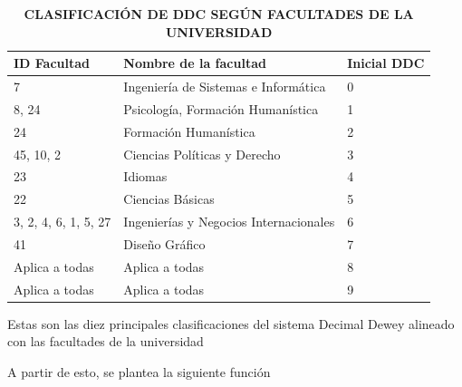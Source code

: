 \documentclass[spanish]{ieee_upb}
\begin{document}
\begin{table}[H]
    
    \centering
    \caption[Clasificación DDC según facultades de la universidad]{\bfseries CLASIFICACIÓN DE DDC SEGÚN FACULTADES DE LA UNIVERSIDAD}
    \label{tab:ddc_facultades}
    \begin{tabular}{lll}
    
        \hline
        \textbf{ID Facultad} & \textbf{Nombre de la facultad} & \textbf{Inicial DDC} \\
        \hline
        7 & Ingeniería de Sistemas e Informática & 0 \\
        
        8, 24 & Psicología, Formación Humanística & 1 \\
        
        24 & Formación Humanística & 2 \\
        
        45, 10, 2 & Ciencias Políticas y Derecho & 3 \\
        
        23 & Idiomas & 4 \\
        
        22 & Ciencias Básicas & 5 \\
        
        3, 2, 4, 6, 1, 5, 27 \hspace{1cm} & Ingenierías y Negocios Internacionales\hspace{1cm} & 6 \\
        
        41 & Diseño Gráfico & 7 \\
        
        Aplica a todas & Aplica a todas & 8 \\
        
        Aplica a todas & Aplica a todas & 9 \\
        \hline
        
    \end{tabular}
    \vspace{2mm}
    
    \small{Estas son las diez principales clasificaciones del sistema Decimal Dewey alineado con las facultades de la universidad}
\end{table}

A partir de esto, se plantea la siguiente función 
\end{document}

